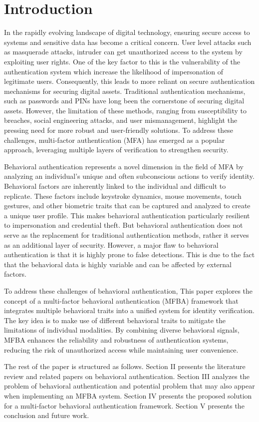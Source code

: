 
\section{Introduction}

In the rapidly evolving landscape of digital technology, ensuring secure access to systems and sensitive data has become a critical concern. 
User level attacks such as masquerade attacks, intruder can get unauthorized access to the system by exploiting user rights.
One of the key factor to this is the vulnerability of the authentication system
which increase the likelihood of impersonation of legitimate users.
Consequently, this leads to more reliant on secure authentication mechanisms for securing digital assets.  
Traditional authentication mechanisms, such as passwords and PINs have long been the cornerstone of securing digital assets. However, the limitation of these methods, ranging from susceptibility to breaches, social engineering attacks, and user mismanagement, highlight the pressing need for more robust and user-friendly solutions. To address these challenges, multi-factor authentication (MFA) has emerged as a popular approach, leveraging multiple layers of verification to strengthen security.

Behavioral authentication represents a novel dimension in the field of MFA by analyzing an individual's unique and often subconscious actions to verify identity.
Behavioral factors are inherently linked to the individual and difficult to replicate.
These factors include keystroke dynamics, mouse movements, touch gestures, and other biometric traits that can be captured and analyzed to create a unique user profile.
This makes behavioral authentication particularly resilient to impersonation and credential theft.
But behavioral authentication does not serve as the replacement for traditional authentication methods, rather it serves as an additional layer of security. 
However, a major flaw to behavioral authentication is that it is highly prone to false detections.
This is due to the fact that the behavioral data is highly variable and can be affected by external factors.

To address these challenges of behavioral authentication, 
This paper explores the concept of a multi-factor behavioral authentication (MFBA) framework that integrates multiple behavioral traits into a unified system for identity verification.
The key idea is to make use of different behavioral traits to mitigate the limitations of individual modalities.
By combining diverse behavioral signals, MFBA enhances the reliability and robustness of authentication systems, reducing the risk of unauthorized access while maintaining user convenience.

The rest of the paper is structured as follows.
Section II presents the literature review and related papers on behavioral authentication.
Section III analyzes the problem of behavioral authentication and potential problem that may also appear when implementing an MFBA system. 
Section IV presents the proposed solution for a multi-factor behavioral authentication framework.
Section V presents the conclusion and future work.
